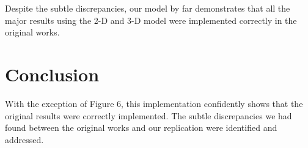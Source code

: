 Despite the subtle discrepancies, our model by far demonstrates that all the major results using the 2-D and 3-D model were implemented correctly in the original works.

\section{Conclusion}

With the exception of Figure 6, this implementation confidently shows that the original results were correctly implemented. The subtle discrepancies we had found between the original works and our replication were identified and addressed.  
